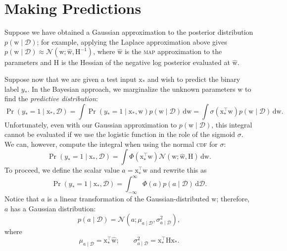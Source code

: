 \documentclass{article}
\newcommand{\acro}[1]{\textsc{\MakeLowercase{#1}}}
\newcommand{\given}{\mid}
\newcommand{\mc}[1]{\mathcal{#1}}
\newcommand{\data}{\mc{D}}
\newcommand{\intd}[1]{\,\mathrm{d}{#1}}
\newcommand{\inv}{^{-1}}
\newcommand{\trans}{^\top}
\newcommand{\mat}[1]{\bm{\mathrm{#1}}}
\renewcommand{\vec}[1]{\bm{\mathrm{#1}}}
\begin{document}
\section*{Making Predictions}

Suppose we have obtained a Gaussian approximation to the posterior
distribution $p(\vec{w} \given \data)$; for example, applying the
Laplace approximation above gives $p(\vec{w} \given \data) \approx
\mc{N}(\vec{w}; \hat{\vec{w}}, \mat{H}\inv)$, where $\hat{\vec{w}}$ is
the \acro{MAP} approximation to the parameters and $\mat{H}$ is the
Hessian of the negative log posterior evaluated at $\hat{\vec{w}}$.

Suppose now that we are given a test input $\vec{x}_\ast$ and wish to
predict the binary label $y_\ast$.  In the Bayesian approach, we
marginalize the unknown parameters $\vec{w}$ to find the
\emph{predictive distribution}:
\begin{equation*}
  \Pr(y_\ast = 1 \given \vec{x}_\ast, \data)
  =
  \int
  \Pr(y_\ast = 1 \given \vec{x}_\ast, \vec{w})
  p(\vec{w} \given \data)
  \intd{\vec{w}}
  =
  \int
  \sigma(\vec{x}_\ast\trans \vec{w})
  p(\vec{w} \given \data)
  \intd{\vec{w}}.
\end{equation*}
Unfortunately, even with our Gaussian approximation to $p(\vec{w}
\given \data)$, this integral cannot be evaluated if we use the
logistic function in the role of the sigmoid $\sigma$.  We can,
however, compute the integral when using the normal \acro{CDF} for
$\sigma$:
\begin{equation*}
  \Pr(y_\ast = 1 \given \vec{x}_\ast, \data)
  =
  \int
  \Phi(\vec{x}_\ast\trans \vec{w})
  \mc{N}(\vec{w}; \hat{\vec{w}}, \mat{H})
  \intd{\vec{w}}.
\end{equation*}
To proceed, we define the scalar value $a = \vec{x}_\ast\trans
\vec{w}$ and rewrite this as
\begin{equation*}
  \Pr(y_\ast = 1 \given \vec{x}_\ast, \data)
  =
  \int_{-\infty}^\infty
  \Phi(a)
  p(a \given \data)
  \intd{\data}.
\end{equation*}
Notice that $a$ is a linear transformation of the Gaussian-distributed
$\vec{w}$; therefore, $a$ has a Gaussian distribution:
\begin{equation*}
  p(a \given \data)
  =
  \mc{N}(a; \mu_{a \given \data}, \sigma^2_{a \given \data}),
\end{equation*}
where
\begin{equation*}
  \mu_{a \given \data} = \vec{x}_\ast\trans \hat{\vec{w}};
  \qquad
  \sigma^2_{a \given \data} = \vec{x}_\ast\trans \mat{H} \vec{x}_\ast.
\end{equation*}
\end{document}
